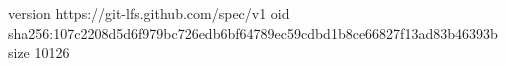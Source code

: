 version https://git-lfs.github.com/spec/v1
oid sha256:107c2208d5d6f979bc726edb6bf64789ec59cdbd1b8ce66827f13ad83b46393b
size 10126
